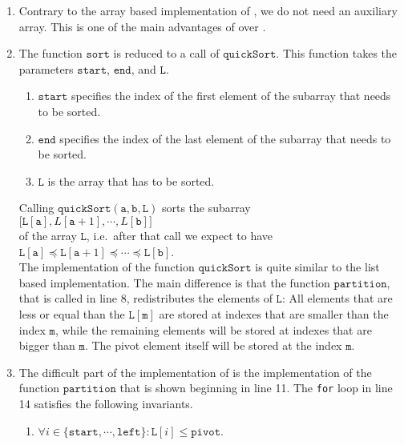 \begin{enumerate}
\item Contrary to the array based implementation of , we do not need an auxiliary
      array.  This is one of the main advantages of  over .
\item The function $\mathtt{sort}$ is reduced to a call of $\mathtt{quickSort}$.  This function
      takes the parameters $\mathtt{start}$, $\mathtt{end}$, and $\mathtt{L}$.  
      \begin{enumerate}
      \item $\mathtt{start}$ specifies the index of the first element of the subarray that needs to be
            sorted.
      \item $\mathtt{end}$ specifies the index of the last element of the subarray that needs to be
            sorted. 
      \item $\mathtt{L}$ is the array that has to be sorted.
      \end{enumerate}
      Calling $\mathtt{quickSort}(\mathtt{a}, \mathtt{b}, \mathtt{L})$ sorts the subarray \\[0.2cm]
      \hspace*{1.3cm} 
      $\bigl[\mathtt{L}[\mathtt{a}], L[\mathtt{a}+1], \cdots, L[\mathtt{b}]\bigr]$
      \\[0.2cm]
      of the array $\mathtt{L}$, i.e.~after that call we expect to have\\[0.2cm]
      \hspace*{1.3cm} 
      $\mathtt{L}[\mathtt{a}] \preceq \mathtt{L}[\mathtt{a}+1] \preceq \cdots \preceq \mathtt{L}[\mathtt{b}]$.
      \\[0.2cm]
      The implementation of the function $\mathtt{quickSort}$
      is quite similar to the list based implementation.  The main difference is that the function
      $\mathtt{partition}$, that is called in line 8, redistributes the elements of $\mathtt{L}$:
      All elements that are less or equal than the  $\mathtt{L[m]}$
      are stored at indexes that are smaller than the index $\mathtt{m}$, while the remaining elements will 
      be stored at indexes that are bigger than $\mathtt{m}$.  The pivot element itself will be stored at the
      index $\mathtt{m}$. 
\item The difficult part of the implementation of  is the implementation of the
      function $\mathtt{partition}$ that is shown beginning in line 11.
      The \texttt{for} loop in line 14 satisfies the following invariants.
      \begin{enumerate}
      \item $\forall i \in \{ \mathtt{start}, \cdots, \mathtt{left} \} : \mathtt{L}[i] \leq \mathtt{pivot}$.


\end{enumerate}
\end{enumerate}
